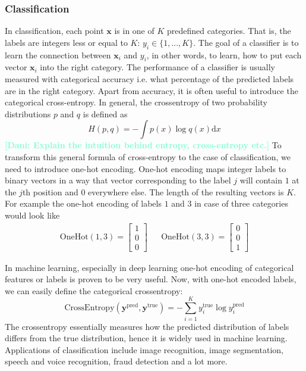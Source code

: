 \documentclass[12pt, a4paper,  nobibnotes]{article}
\newcommand{\dd}{\mathrm{d}}
\newcommand{\nd}[1]{\textcolor{Aquamarine}{\textbf{[Dani: #1]}}}
\begin{document}
\subsubsection{Classification}
In classification, each point $\mathbf x$ is in one of $K$ predefined categories. That is, 
the labels are integers less or equal to $K$: $y_i \in \{1, ..., K\}$. The goal of a classifier 
is to learn the connection between $\mathbf x_i$ and $y_i$, in other words, to learn, how to 
put each vector $\mathbf x_i$ into the right category. The performance of a classifier is usually measured
with categorical accuracy i.e. what percentage of the predicted labels are in the right category.
Apart from accuracy, it is often useful to introduce the categorical cross-entropy. In general, the 
crossentropy of two probability distributions $p$ and $q$ is defined as 
\begin{equation}
    H(p,q) = -\int p(x)\log q(x)\dd x
\end{equation}
\nd{Explain the intuition behind entropy, cross-entropy etc.}
To transform this general formula of cross-entropy to the case of classification, we need to introduce
one-hot encoding. One-hot encoding maps integer labels to binary vectors in a way that vector 
corresponding to the label $j$ will contain $1$ at the $j$th position and $0$ everywhere else. The
length of the resulting vectors is $K$. For example the one-hot encoding of labels $1$ and $3$ in case of 
three categories would look like
\begin{align}
    \textrm{OneHot}(1,3) = \begin{bmatrix}
        1\\0\\0
    \end{bmatrix}
    &&\textrm{OneHot}(3,3) = \begin{bmatrix}
        0\\0\\1
    \end{bmatrix}
\end{align}

In machine learning, especially in deep learning one-hot encoding of categorical features or labels
is proven to be very useful. Now, with one-hot encoded labels, we can easily define the categorical
crossentropy:
\begin{equation}
    \textrm{CrossEntropy}(\mathbf y^{\textrm{pred}}, \mathbf y^{\textrm{true}})
    = -\sum\limits_{i=1}^K y_i^{\textrm{true}} \log y_i^{\textrm{pred}} 
\end{equation}
The crossentropy essentially measures how the predicted distribution of labels differs from the 
true distribution, hence it is widely used in machine learning.
Applications of classification include image recognition, image segmentation, speech and voice recognition,
fraud detection and a lot more. 
\end{document}
